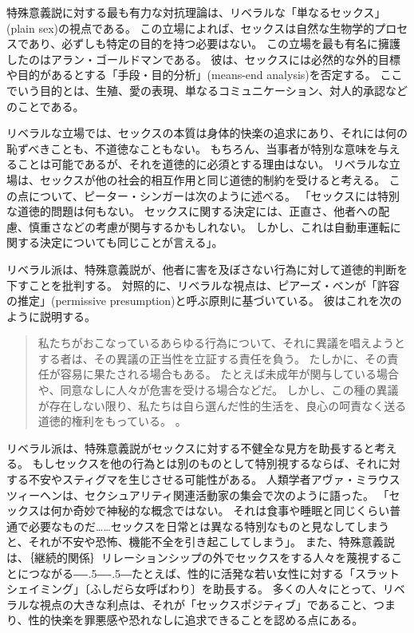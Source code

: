 \documentclass[paper=a4,book,openany]{jlreq}
\newcommand{\ig}[1]{}           %
\def\DDASH{―\kern-.5\zw―\kern-.5\zw―} %
\begin{document}
特殊意義説に対する最も有力な対抗理論は、リベラルな「単なるセックス」(plain sex)の視点である。
この立場によれば、セックスは自然な生物学的プロセスであり、必ずしも特定の目的を持つ必要はない。
この立場を最も有名に擁護したのはアラン・ゴールドマンである。
彼は、セックスには必然的な外的目標や目的があるとする「手段・目的分析」(means-end analysis)を否定する。
ここでいう目的とは、生殖、愛の表現、単なるコミュニケーション、対人的承認などのことである\citep{goldman77:_plain_sex}\ig{Alan Goldman}。

リベラルな立場では、セックスの本質は身体的快楽の追求にあり、それには何の恥ずべきことも、不道徳なこともない。
もちろん、当事者が特別な意味を与えることは可能であるが、それを道徳的に必須とする理由はない。
リベラルな立場は、セックスが他の社会的相互作用と同じ道徳的制約を受けると考える。
この点について、ピーター・シンガーは次のように述べる。
「セックスには特別な道徳的問題は何もない。
セックスに関する決定には、正直さ、他者への配慮、慎重さなどの考慮が関与するかもしれない。
しかし、これは自動車運転に関する決定についても同じことが言える」\citep[p.2]{singer79:_pract_ethic}。

リベラル派は、特殊意義説が、他者に害を及ぼさない行為に対して道徳的判断を下すことを批判する。
対照的に、リベラルな視点は、ピアーズ・ベンが「許容の推定」(permissive presumption)と呼ぶ原則に基づいている。
彼はこれを次のように説明する。
\begin{quote}
  私たちがおこなっているあらゆる行為について、それに異議を唱えようとする者は、その異議の正当性を立証する責任を負う。
たしかに、その責任が容易に果たされる場合もある。
たとえば未成年が関与している場合や、同意なしに人々が危害を受ける場合などだ。
しかし、この種の異議が存在しない限り、私たちは自ら選んだ性的生活を、良心の呵責なく送る道徳的権利をもっている。
\citep[p.237]{benn99:_is_sex_moral_special}。
\end{quote}
リベラル派は、特殊意義説がセックスに対する不健全な見方を助長すると考える。
もしセックスを他の行為とは別のものとして特別視するならば、それに対する不安やスティグマを生じさせる可能性がある。
人類学者アヴァ・ミラウスツィーヘンは、セクシュアリティ関連活動家の集会で次のように語った。
「セックスは何か奇妙で神秘的な概念ではない。
それは食事や睡眠と同じくらい普通で必要なものだ……セックスを日常とは異なる特別なものと見なしてしまうと、それが不安や恐怖、機能不全を引き起こしてしまう」\citep{fein13:_why_sex_is}。
また、特殊意義説は、｛継続的関係｝{リレーションシップ}の外でセックスをする人々を蔑視することにつながる{\DDASH}たとえば、性的に活発な若い女性に対する「スラットシェイミング」〔ふしだら女呼ばわり〕を助長する。
多くの人々にとって、リベラルな視点の大きな利点は、それが「セックスポジティブ」であること、つまり、性的快楽を罪悪感や恐れなしに追求できることを認める点にある。
\end{document}
